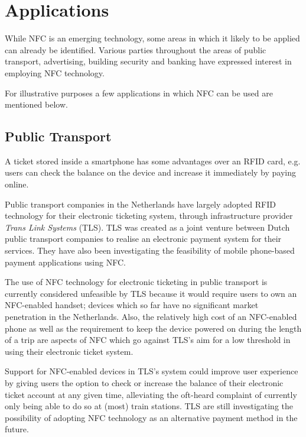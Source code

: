 \section{Applications}
While NFC is an emerging technology, some areas in which it likely to be applied can already be identified.
Various parties throughout the areas of public transport, advertising, building security and banking have expressed interest in employing NFC technology.

For illustrative purposes a few applications in which NFC can be used are mentioned below.

\subsection{Public Transport}
A ticket stored inside a smartphone has some advantages over an RFID card, e.g. users can check the balance on the device and increase it immediately by paying online.

Public transport companies in the Netherlands have largely adopted RFID technology for their electronic ticketing system, through infrastructure provider \textit{Trans Link Systems} (TLS).
TLS was created as a joint venture between Dutch public transport companies to realise an electronic payment system for their services.
They have also been investigating the feasibility of mobile phone-based payment applications using NFC.

The use of NFC technology for electronic ticketing in public transport is currently considered unfeasible by TLS because it would require users to own an NFC-enabled handset; devices which so far have no significant market penetration in the Netherlands.
Also, the relatively high cost of an NFC-enabled phone as well as the requirement to keep the device powered on during the length of a trip are aspects of NFC which go against TLS's aim for a low threshold in using their electronic ticket system.

Support for NFC-enabled devices in TLS's system could improve user experience by giving users the option to check or increase the balance of their electronic ticket account at any given time, alleviating the oft-heard complaint of currently only being able to do so at (most) train stations.
TLS are still investigating the possibility of adopting NFC technology as an alternative payment method in the future. \cite{OVchipkaart} %

